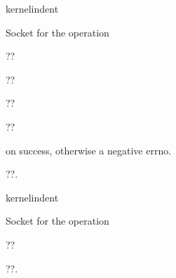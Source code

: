 \documentclass[letterpaper,10pt,english]{sphinxmanual}
\begin{document}
\begin{sphinxuseclass}{kernelindent}
\sphinxAtStartPar
{}
\begin{description}
\sphinxAtStartPar
Socket for the operation

\sphinxAtStartPar
??

\sphinxAtStartPar
??

\sphinxAtStartPar
??

\sphinxAtStartPar
??

\end{description}

\sphinxAtStartPar
{}

 on success, otherwise a negative errno.

\end{sphinxuseclass}

\begin{fulllineitems}
\label{\detokenize{mtpimpl.c:c.MTP_hash}}
\pysigstartsignatures
\pysigstartmultiline
{}
\pysigstopmultiline
\pysigstopsignatures
\sphinxAtStartPar
??.

\end{fulllineitems}


\begin{sphinxuseclass}{kernelindent}
\sphinxAtStartPar
{}
\begin{description}
\sphinxAtStartPar
Socket for the operation

\end{description}

\sphinxAtStartPar
{}

\sphinxAtStartPar
??

\end{sphinxuseclass}

\begin{fulllineitems}
\label{\detokenize{mtpimpl.c:c.MTP_unhash}}
\pysigstartsignatures
\pysigstartmultiline
{}
\pysigstopmultiline
\pysigstopsignatures
\sphinxAtStartPar
??.

\end{fulllineitems}
\end{document}
